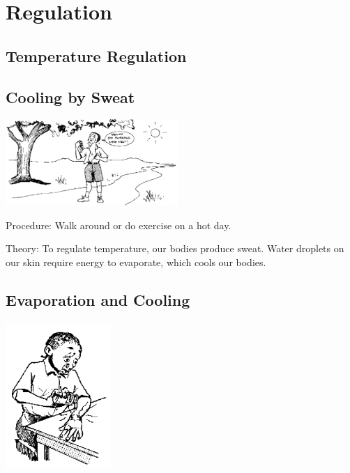 \section{Regulation}

\begin{multicols}{2}


\section*{Temperature Regulation}


\subsection{Cooling by Sweat}

\begin{center}
\includegraphics[width=0.49\textwidth]{./img/source/sweating.png}
\end{center}

\begin{description*}
\item[Procedure:]{Walk around or do exercise on a hot day.}
\item[Theory:]{To regulate temperature, our bodies produce sweat. Water droplets on our skin require energy to evaporate, which cools our bodies.}
\end{description*}

\subsection{Evaporation and Cooling}

\begin{center}
\includegraphics[width=0.3\textwidth]{./img/source/evap-cooling.png}
\end{center}


\end{multicols}
